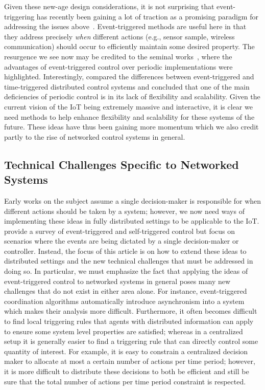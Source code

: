 \documentclass{autart}
\begin{document}
Given these new-age design considerations, it is not surprising that
event-triggering has recently been gaining a lot of traction as a
promising paradigm for addressing the issues
above~\citep{CP-AZ-PC-DG:14,PK-CP-GE-MP:16}. Event-triggered methods
are useful here in that they address precisely \emph{when} different
actions (e.g., sensor sample, wireless communication) should occur to
efficiently maintain some desired property. The resurgence we see now
may be credited to the seminal works~\citep{KJA-BMB:99,KJA-BMB:02,KEA:99}, where
the advantages of event-triggered control over periodic
implementations were highlighted. Interestingly, \cite{AA-RB:04}
compared the differences between event-triggered and time-triggered
distributed control systems and concluded that one of the main
deficiencies of periodic control is in its lack of flexibility and
scalability. Given the current vision of the IoT being extremely
massive and interactive, it is clear we need methods to help enhance
flexibility and scalability for these systems of the future. These
ideas have thus been gaining more momentum which we also credit partly
to the rise of networked control systems in general.

\subsection*{Technical Challenges {Specific to Networked}
  Systems}

Early works on the subject assume a single decision-maker is
responsible for when different actions should be taken by a system;
however, we now need ways of implementing these ideas in fully
distributed settings to be applicable to the
IoT. \cite{WPMHH-KHJ-PT:12} provide a survey of event-triggered and
self-triggered control but focus on scenarios where the events are
being dictated by a single decision-maker or controller. Instead, the
focus of this article is on how to extend these ideas to distributed
settings and the new technical challenges that must be addressed in
doing so. In particular, we must emphasize the fact that applying the
ideas of event-triggered control to networked systems in general poses
many new challenges that do not exist in either area alone. For
instance, event-triggered coordination algorithms automatically
introduce asynchronism into a system which makes their analysis more
difficult. Furthermore, it often becomes difficult to find local
triggering rules that agents with distributed information can apply to
ensure some system level properties are satisfied; whereas in a
centralized setup it is generally easier to find a triggering rule
that can directly control some quantity of interest. For example, it
is easy to constrain a centralized decision maker to allocate at most
a certain number of actions per time period; however, it is more
difficult to distribute these decisions to both be efficient and still
be sure that the total number of actions per time period constraint is
respected.
\end{document}
